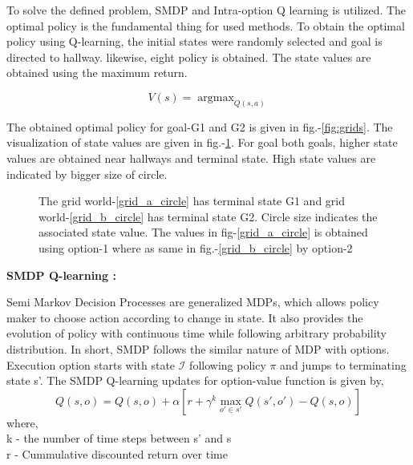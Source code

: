 \documentclass[preprint,12pt]{elsarticle}
\DeclareMathOperator*{\argmax}{argmax}
\begin{document}
To solve the defined problem, SMDP and Intra-option Q learning is utilized. The optimal policy is the fundamental thing for used methods. To obtain the optimal policy using Q-learning, the initial states were randomly selected and goal is directed to hallway. likewise, eight policy is obtained. The state values are obtained using the maximum return.

\begin{equation}
	V(s) = \argmax_{Q(s,a)} 
\end{equation}

The obtained optimal policy for goal-G1 and G2 is given in fig.-\ref{fig:grids}. The visualization of state values are given in fig.-\ref{fig:state_val}. For goal both goals, higher state values are obtained near hallways and terminal state. High state values are indicated by bigger size of circle. 

\begin{figure}[H]
	\centering  
	\caption{The grid world-\ref{grid_a_circle} has terminal state G1 and grid world-\ref{grid_b_circle} has terminal state G2. Circle size indicates the associated state value. The values in fig-\ref{grid_a_circle} is obtained using option-1 where as same in fig.-\ref{grid_b_circle} by option-2}
	\label{fig:state_val}
\end{figure}

\textbf{SMDP Q-learning :}

Semi Markov Decision Processes are generalized MDPs, which allows policy maker to choose action according to change in state. It also provides the evolution of policy with continuous time while following arbitrary probability distribution. In short, SMDP follows the similar nature of MDP with options. Execution option starts with state $\mathcal{I}$ following policy $\pi$ and jumps to terminating state s'. The SMDP Q-learning updates for option-value function is given by,
\begin{equation}
	Q(s,o)  = Q(s,o) + \alpha [ r + \gamma^k \max_{o'\in s'} Q(s',o') - Q(s,o)]
\end{equation}
where, \\
k -  the number of time steps between s' and s \\
r - Cummulative discounted return over time\\
\end{document}
